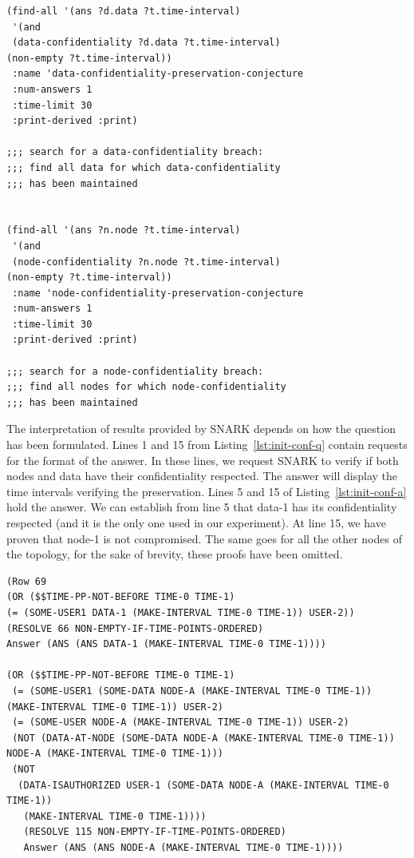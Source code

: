 
\begin{lstlisting}[caption=SNARK question to validate the initial situation., label=lst:init-conf-q] 
(find-all '(ans ?d.data ?t.time-interval)
 '(and
 (data-confidentiality ?d.data ?t.time-interval)
(non-empty ?t.time-interval))
 :name 'data-confidentiality-preservation-conjecture
 :num-answers 1
 :time-limit 30  
 :print-derived :print)

;;; search for a data-confidentiality breach:
;;; find all data for which data-confidentiality
;;; has been maintained


(find-all '(ans ?n.node ?t.time-interval)
 '(and
 (node-confidentiality ?n.node ?t.time-interval)
(non-empty ?t.time-interval))
 :name 'node-confidentiality-preservation-conjecture
 :num-answers 1
 :time-limit 30  
 :print-derived :print)

;;; search for a node-confidentiality breach:
;;; find all nodes for which node-confidentiality 
;;; has been maintained
\end{lstlisting}

The interpretation of results provided by SNARK depends on how the question has been formulated.
Lines 1 and 15 from Listing~\ref{lst:init-conf-q} contain requests for the format of the answer.
In these lines, we request SNARK to verify if both nodes and data have their confidentiality respected. The answer will display the time intervals verifying the preservation.
Lines 5 and 15 of Listing~\ref{lst:init-conf-a} hold the answer.
We can establish from line 5 that data-1 has its confidentiality respected (and it is the only one used in our experiment).
At line 15, we have proven that node-1 is not compromised.
The same goes for all the other nodes of the topology, 
for the sake of brevity, these proofs have been omitted.

\begin{lstlisting}[caption=SNARK validating the initial situation, label=lst:init-conf-a] 
(Row 69
(OR ($$TIME-PP-NOT-BEFORE TIME-0 TIME-1) 
(= (SOME-USER1 DATA-1 (MAKE-INTERVAL TIME-0 TIME-1)) USER-2))
(RESOLVE 66 NON-EMPTY-IF-TIME-POINTS-ORDERED)
Answer (ANS (ANS DATA-1 (MAKE-INTERVAL TIME-0 TIME-1)))) 

(OR ($$TIME-PP-NOT-BEFORE TIME-0 TIME-1)
 (= (SOME-USER1 (SOME-DATA NODE-A (MAKE-INTERVAL TIME-0 TIME-1)) (MAKE-INTERVAL TIME-0 TIME-1)) USER-2)
 (= (SOME-USER NODE-A (MAKE-INTERVAL TIME-0 TIME-1)) USER-2)
 (NOT (DATA-AT-NODE (SOME-DATA NODE-A (MAKE-INTERVAL TIME-0 TIME-1)) NODE-A (MAKE-INTERVAL TIME-0 TIME-1)))
 (NOT
  (DATA-ISAUTHORIZED USER-1 (SOME-DATA NODE-A (MAKE-INTERVAL TIME-0 TIME-1))
   (MAKE-INTERVAL TIME-0 TIME-1))))
   (RESOLVE 115 NON-EMPTY-IF-TIME-POINTS-ORDERED)
   Answer (ANS (ANS NODE-A (MAKE-INTERVAL TIME-0 TIME-1)))) 
\end{lstlisting}



